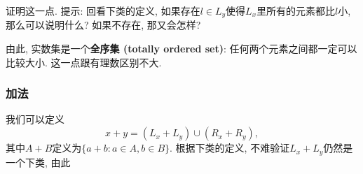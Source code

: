 \begin{exercise}{}
证明这一点. 提示: 回看下类的定义, 如果存在$l\in L_y$使得$L_x$里所有的元素都比$l$小, 那么可以说明什么? 如果不存在, 那又会怎样?
\end{exercise}

由此, 实数集是一个\textbf{全序集 (totally ordered set)}: 任何两个元素之间都一定可以比较大小. 这一点跟有理数区别不大.

\subsubsection{加法}

我们可以定义
$$
x+y=(L_x+L_y)\cup(R_x+R_y),
$$
其中$A+B$定义为$\{a+b:a\in A, b\in B\}$. 根据下类的定义, 不难验证$L_x+L_y$仍然是一个下类, 由此